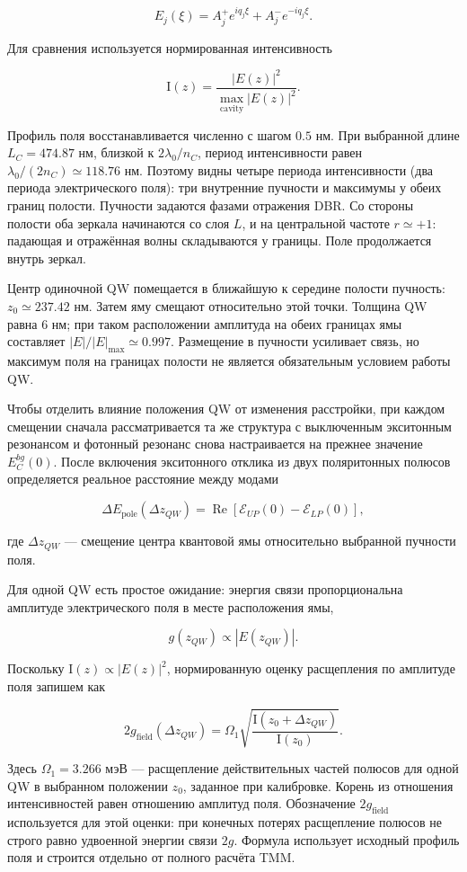 \documentclass[12pt,a4paper]{article}
\begin{document}
\[
E_j(\xi)
=
A_j^+e^{iq_j\xi}
+
A_j^-e^{-iq_j\xi}.
\]

Для сравнения используется нормированная интенсивность

\[
\mathrm{I}(z)=
\frac{|E(z)|^2}
{\max_{\mathrm{cavity}}|E(z)|^2}.
\]

Профиль поля восстанавливается численно с шагом $0.5$ нм. При выбранной длине $L_C=474.87$ нм, близкой к $2\lambda_0/n_C$, период интенсивности равен $\lambda_0/(2n_C)\simeq118.76$ нм. Поэтому видны четыре периода интенсивности (два периода электрического поля): три внутренние пучности и максимумы у обеих границ полости. Пучности задаются фазами отражения DBR. Со стороны полости оба зеркала начинаются со слоя $L$, и на центральной частоте $r\simeq+1$: падающая и отражённая волны складываются у границы. Поле продолжается внутрь зеркал.

Центр одиночной QW помещается в ближайшую к середине полости пучность: $z_0\simeq237.42$ нм. Затем яму смещают относительно этой точки. Толщина QW равна $6$ нм; при таком расположении амплитуда на обеих границах ямы составляет $|E|/|E|_{\max}\simeq0.997$. Размещение в пучности усиливает связь, но максимум поля на границах полости не является обязательным условием работы QW.

Чтобы отделить влияние положения QW от изменения расстройки, при каждом смещении сначала рассматривается та же структура с выключенным экситонным резонансом и фотонный резонанс снова настраивается на прежнее значение $E_C^{bg}(0)$. После включения экситонного отклика из двух поляритонных полюсов определяется реальное расстояние между модами

\[
\Delta E_{\mathrm{pole}}(\Delta z_{QW})
=
\operatorname{Re}
\left[
\mathcal E_{UP}(0)-\mathcal E_{LP}(0)
\right],
\]

где $\Delta z_{QW}$ --- смещение центра квантовой ямы относительно выбранной пучности поля.

Для одной QW есть простое ожидание: энергия связи пропорциональна амплитуде электрического поля в месте расположения ямы,

\[
g(z_{QW})\propto |E(z_{QW})|.
\]

Поскольку $\mathrm{I}(z)\propto|E(z)|^2$, нормированную оценку расщепления по амплитуде поля запишем как

\[
2g_{\mathrm{field}}(\Delta z_{QW})=\Omega_1\sqrt{\frac{\mathrm{I}(z_0+\Delta z_{QW})}{\mathrm{I}(z_0)}}.
\]

Здесь $\Omega_1=3.266$ мэВ --- расщепление действительных частей полюсов для одной QW в выбранном положении $z_0$, заданное при калибровке. Корень из отношения интенсивностей равен отношению амплитуд поля. Обозначение $2g_{\mathrm{field}}$ используется для этой оценки: при конечных потерях расщепление полюсов не строго равно удвоенной энергии связи $2g$. Формула использует исходный профиль поля и строится отдельно от полного расчёта TMM.
\end{document}
